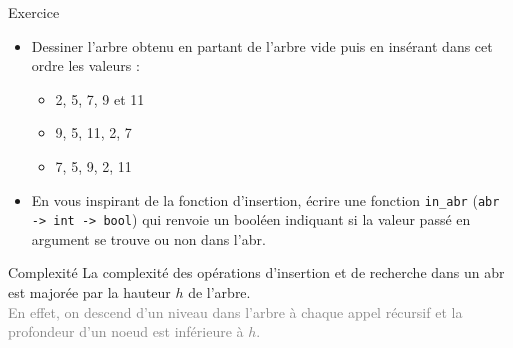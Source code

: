\documentclass[10pt]{beamer}
\begin{document}
\begin{frame}[fragile]{\Ctitle}{\stitle}
	\begin{exampleblock}{Exercice}
		\begin{itemize}
			\item<1-> Dessiner l'arbre obtenu en partant de l'arbre vide puis en insérant dans cet ordre les valeurs :
				\begin{itemize}
					\item<2-> 2, 5, 7, 9 et 11
					\item<3-> 9, 5, 11, 2, 7
					\item<4-> 7, 5, 9, 2, 11
				\end{itemize}
				\item<5->En vous inspirant de la fonction d'insertion, écrire une fonction {\tt in\_abr} ({\tt abr -> int -> bool}) qui renvoie un booléen indiquant si la valeur passé en argument se trouve ou non dans l'{\sc abr}.
				\onslide<6->{\inputOCaml{\SPATH/appartientml.ml}{}{}}
		\end{itemize}
	\end{exampleblock}
\end{frame}

\begin{frame}[fragile]{\Ctitle}{\stitle}
	\begin{block}{Complexité}
		La complexité des opérations d'insertion et de recherche dans un {\sc abr} est majorée par la hauteur $h$ de l'arbre. \\
		\onslide<2->\textcolor{gray}{\small En effet, on descend d'un niveau dans l'arbre à chaque appel récursif et la profondeur d'un noeud est inférieure à $h$.}\\
	\end{block}
\end{frame}
\end{document}
